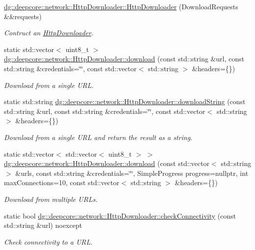 \begin{DoxyCompactItemize}
\hyperlink{group___network_module_gaf623ef672fad2678ff7a1f1dd8361d95}{dg\+::deepcore\+::network\+::\+Http\+Downloader\+::\+Http\+Downloader} (Download\+Requests \&\&requests)
\begin{DoxyCompactList}\small\item\em Contruct an \hyperlink{classdg_1_1deepcore_1_1network_1_1_http_downloader}{Http\+Downloader}. \end{DoxyCompactList}\item 
static std\+::vector$<$ uint8\+\_\+t $>$ \hyperlink{group___network_module_ga8f1ba1b79c2af5d051f6e8591cd0ea89}{dg\+::deepcore\+::network\+::\+Http\+Downloader\+::download} (const std\+::string \&url, const std\+::string \&credentials=\char`\"{}\char`\"{}, const std\+::vector$<$ std\+::string $>$ \&headers=\{\})
\begin{DoxyCompactList}\small\item\em Download from a single U\+RL. \end{DoxyCompactList}\item 
static std\+::string \hyperlink{group___network_module_ga06013d9acaf746065be05b6571f2462a}{dg\+::deepcore\+::network\+::\+Http\+Downloader\+::download\+String} (const std\+::string \&url, const std\+::string \&credentials=\char`\"{}\char`\"{}, const std\+::vector$<$ std\+::string $>$ \&headers=\{\})
\begin{DoxyCompactList}\small\item\em Download from a single U\+RL and return the result as a string. \end{DoxyCompactList}\item 
static std\+::vector$<$ std\+::vector$<$ uint8\+\_\+t $>$ $>$ \hyperlink{group___network_module_ga07d51f62025e158feeca83cbc40d8564}{dg\+::deepcore\+::network\+::\+Http\+Downloader\+::download} (const std\+::vector$<$ std\+::string $>$ \&urls, const std\+::string \&credentials=\char`\"{}\char`\"{}, Simple\+Progress progress=nullptr, int max\+Connections=10, const std\+::vector$<$ std\+::string $>$ \&headers=\{\})
\begin{DoxyCompactList}\small\item\em Download from multiple U\+R\+Ls. \end{DoxyCompactList}\item 
static bool \hyperlink{group___network_module_gab82b59cab6622abae4998f5fde08e688}{dg\+::deepcore\+::network\+::\+Http\+Downloader\+::check\+Connectivity} (const std\+::string \&url) noexcept
\begin{DoxyCompactList}\small\item\em Check connectivity to a U\+RL. \end{DoxyCompactList}\item 

\end{DoxyCompactItemize}
